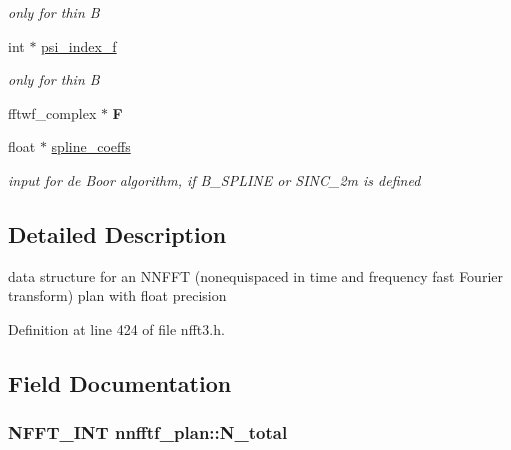 \begin{DoxyCompactItemize}
\begin{DoxyCompactList}\small\item\em only for thin B \end{DoxyCompactList}\item 
\hypertarget{structnnfftf__plan_a3788434fa045ecd49dd89d116bb40c47}{int $\ast$ \hyperlink{structnnfftf__plan_a3788434fa045ecd49dd89d116bb40c47}{psi\-\_\-index\-\_\-f}}\label{structnnfftf__plan_a3788434fa045ecd49dd89d116bb40c47}

\begin{DoxyCompactList}\small\item\em only for thin B \end{DoxyCompactList}\item 
\hypertarget{structnnfftf__plan_a5f089ea9bae2fa4078bb84bd0aa86b64}{fftwf\-\_\-complex $\ast$ {\bfseries F}}\label{structnnfftf__plan_a5f089ea9bae2fa4078bb84bd0aa86b64}

\item 
\hypertarget{structnnfftf__plan_acb221c7694859d0828bcc1f56154cd69}{float $\ast$ \hyperlink{structnnfftf__plan_acb221c7694859d0828bcc1f56154cd69}{spline\-\_\-coeffs}}\label{structnnfftf__plan_acb221c7694859d0828bcc1f56154cd69}

\begin{DoxyCompactList}\small\item\em input for de Boor algorithm, if B\-\_\-\-S\-P\-L\-I\-N\-E or S\-I\-N\-C\-\_\-2m is defined \end{DoxyCompactList}\end{DoxyCompactItemize}


\subsection{Detailed Description}
data structure for an N\-N\-F\-F\-T (nonequispaced in time and frequency fast Fourier transform) plan with float precision 

Definition at line 424 of file nfft3.\-h.



\subsection{Field Documentation}
\hypertarget{structnnfftf__plan_ab718db4df19aece943e75ba1f0208e4e}{
\subsubsection[{N\-\_\-total}]{\setlength{\rightskip}{0pt plus 5cm}N\-F\-F\-T\-\_\-\-I\-N\-T nnfftf\-\_\-plan\-::\-N\-\_\-total}}\label{structnnfftf__plan_ab718db4df19aece943e75ba1f0208e4e}


